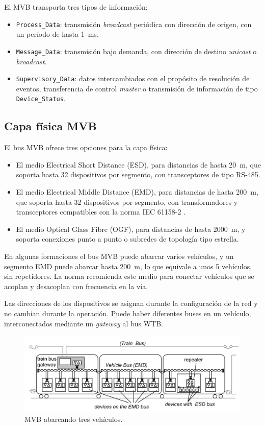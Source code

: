 El MVB transporta tres tipos de información:

\begin{itemize}
\item \texttt{Process\_Data}: transmisión \textit{broadcast} periódica con dirección de origen, con un período de hasta 1~ms.
\item \texttt{Message\_Data}: transmisión bajo demanda, con dirección de destino \textit{unicast} o \textit{broadcast}.
\item \texttt{Supervisory\_Data}: datos intercambiados con el propósito de resolución de eventos, transferencia de control \textit{master} o transmisión de información de tipo \texttt{Device\_Status}.
\end{itemize}

\subsection{Capa física MVB}

El bus MVB ofrece tres opciones para la capa física:

\begin{itemize}
\item El medio Electrical Short Distance (ESD), para distancias de hasta 20~m, que soporta hasta 32 dispositivos por segmento, con transceptores de tipo RS-485.
\item El medio Electrical Middle Distance (EMD), para distancias de hasta 200~m, que soporta hasta  32 dispositivos por segmento, con transformadores y transceptores compatibles con la norma IEC 61158-2 \cite{iec61158_2}.
\item El medio Optical Glass Fibre (OGF), para distancias de hasta 2000~m, y soporta conexiones punto a punto o subredes de topología tipo estrella.
\end{itemize}

En algunas formaciones el bus MVB puede abarcar varios vehículos, y un segmento EMD puede abarcar hasta 200~m, lo que equivale a unos 5 vehículos, sin repetidores. La norma recomienda este medio para conectar vehículos que se acoplan y desacoplan con frecuencia en la vía.

Las direcciones de los dispositivos se asignan durante la configuración de la red y no cambian durante la operación. Puede haber diferentes buses en un vehículo, interconectados mediante un \textit{gateway} al bus WTB.

\begin{figure}[htbp]
	\centering
	\includegraphics[width=1\textwidth]{./Figures/tcn-emd-esd-wtb.png}
	\caption[MVB abarcando tres vehículos]{MVB abarcando tres vehículos.
        \\ }
\end{figure}

